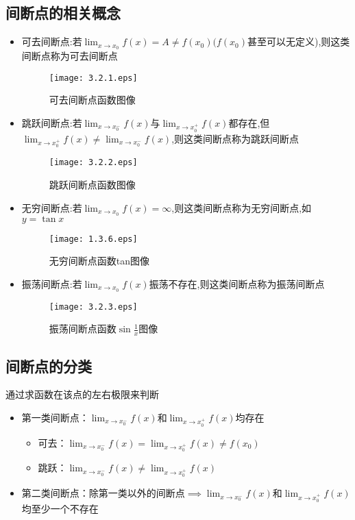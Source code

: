 \documentclass[12pt, a4paper, oneside, UTF8]{ctexbook}
\begin{document}
\begin{sloppypar}
    \subsection{间断点的相关概念}
    \begin{itemize}
        \item 可去间断点:若$\lim_{x\to x_0}f(x)=A\neq f(x_0)(f(x_0)$甚至可以无定义),则这类间断点称为可去间断点
              \begin{figure}[H]
                  \centering \texttt{[image: 3.2.1.eps]} \caption{可去间断点函数图像}
              \end{figure}
        \item 跳跃间断点:若$\lim_{x\to x_0^-}f(x)$与$\lim_{x\to x_0^+}f(x)$都存在,但$\lim_{x\to x_0^+}f(x)\neq\lim_{x\to x_0^-}f(x)$,则这类间断点称为跳跃间断点
              \begin{figure}[H]
                  \centering \texttt{[image: 3.2.2.eps]} \caption{跳跃间断点函数图像}
              \end{figure}
        \item 无穷间断点:若$\lim_{x\to x_0}f(x)=\infty$,则这类间断点称为无穷间断点,如$y=\tan x$
              \begin{figure}[H]
                  \centering \texttt{[image: 1.3.6.eps]} \caption{无穷间断点函数tan图像}
              \end{figure}
        \item 振荡间断点:若$\lim_{x\to x_0}f(x)$振荡不存在,则这类间断点称为振荡间断点
              \begin{figure}[H]
                  \centering \texttt{[image: 3.2.3.eps]} \caption{振荡间断点函数$\sin \frac{1}{x}$图像}
              \end{figure}
    \end{itemize}
    \subsection{间断点的分类}
    通过求函数在该点的左右极限来判断
    \begin{itemize}
        \item 第一类间断点：$\lim _ { x \rightarrow x _ { 0 } ^{-}} f ( x )$​ 和$\lim _ { x \rightarrow x _ { 0 }^ {+}} f ( x )$​ 均存在
              \begin{itemize}
                  \item 可去：$\lim _ { x \rightarrow x_0 ^ { - } } f ( x ) = \lim _ { x \rightarrow x_0^{+} } f  ( x ) \neq f(x_0)$
                  \item 跳跃：$\lim _ { x \rightarrow x_0^{-} } f ( x ) \not= \lim _ { x \rightarrow x_0^{+} } f ( x )$
              \end{itemize}
        \item 第二类间断点：除第一类以外的间断点$\implies \lim _ { x \rightarrow x _ { 0 } ^{-}} f ( x )$和$\lim _ { x \rightarrow x _ { 0 }^ {+}} f ( x )$​ 均至少一个不存在
    \end{itemize}
    \ifx\allfiles\undefined
\end{sloppypar}
\end{document}
